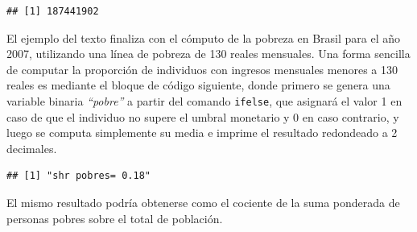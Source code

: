 \documentclass[
]{book}
\newenvironment{Shaded}{\begin{snugshade}}{\end{snugshade}}
\newcommand{\AttributeTok}[1]{\textcolor[rgb]{0.77,0.63,0.00}{#1}}
\newcommand{\CommentTok}[1]{\textcolor[rgb]{0.56,0.35,0.01}{\textit{#1}}}
\newcommand{\DecValTok}[1]{\textcolor[rgb]{0.00,0.00,0.81}{#1}}
\newcommand{\FloatTok}[1]{\textcolor[rgb]{0.00,0.00,0.81}{#1}}
\newcommand{\FunctionTok}[1]{\textcolor[rgb]{0.00,0.00,0.00}{#1}}
\newcommand{\NormalTok}[1]{#1}
\newcommand{\OtherTok}[1]{\textcolor[rgb]{0.56,0.35,0.01}{#1}}
\newcommand{\SpecialCharTok}[1]{\textcolor[rgb]{0.00,0.00,0.00}{#1}}
\newcommand{\StringTok}[1]{\textcolor[rgb]{0.31,0.60,0.02}{#1}}
\begin{document}
\begin{Shaded}
\end{Shaded}

\begin{verbatim}
## [1] 187441902
\end{verbatim}

El ejemplo del texto finaliza con el cómputo de la pobreza en Brasil para el año 2007, utilizando una línea de pobreza de 130 reales mensuales. Una forma sencilla de computar la proporción de individuos con ingresos mensuales menores a 130 reales es mediante el bloque de código siguiente, donde primero se genera una variable binaria \emph{``pobre''} a partir del comando \texttt{ifelse}, que asignará el valor 1 en caso de que el individuo no supere el umbral monetario y 0 en caso contrario, y luego se computa simplemente su media e imprime el resultado redondeado a 2 decimales.

\begin{Shaded}
\end{Shaded}

\begin{verbatim}
## [1] "shr pobres= 0.18"
\end{verbatim}

El mismo resultado podría obtenerse como el cociente de la suma ponderada de personas pobres sobre el total de población.
\end{document}
